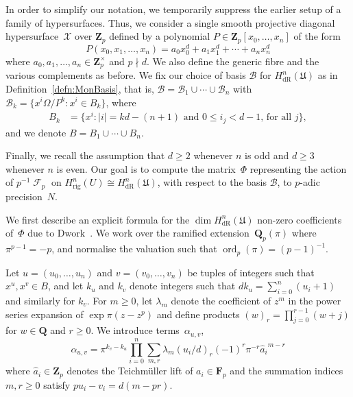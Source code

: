 \documentclass[a4paper,11pt]{article}
\numberwithin{equation}{section}
\providecommand{\abs}[1]{\lvert#1\rvert}                 %
\newcommand{\ZZ}{\mathbf{Z}} %
\newcommand{\QQ}{\mathbf{Q}} %
\DeclareMathOperator{\ord}{ord}          %
\DeclareMathOperator{\Frob}{\mathcal{F}} %
\providecommand{\HdR}{H_{\text{dR}}}    %
\providecommand{\Hrig}{H_{\text{rig}}}  %
\providecommand{\cB}{\mathcal{B}} %
\theoremstyle{definition}
\begin{document}
In order to simplify our notation, we temporarily suppress the earlier 
setup of a family of hypersurfaces. Thus, we consider a single smooth 
projective diagonal hypersurface~$\mathcal{X}$ over $\ZZ_p$ defined by 
a polynomial $P \in \ZZ_p[x_0, \dotsc, x_n]$ of the form
\begin{equation}
P(x_0, x_1, \dotsc, x_n) = 
    a_0 x_0^d + a_1 x_1^d + \dotsb + a_n x_n^d
\end{equation}
where $a_0, a_1, \dotsc, a_n \in \ZZ_p^{\times}$ and $p \nmid d$.  
We also define the generic fibre and the various complements as 
before.  We fix our choice of basis $\cB$ for $\HdR^{n}(\mathfrak{U})$ 
as in Definition~\ref{defn:MonBasis}, that is, $\cB = \cB_1 \cup \cdots \cup \cB_n$
with $\mathcal{B}_k  = \{x^i \Omega / P^k : x^i \in B_k \}$, where 
\begin{align}
B_k & = \{ x^i : \text{$\abs{i} = kd - (n+1)$ and $0 \leq i_j < d-1$, for all $j$} \},
\end{align}
and we denote $B = B_1 \cup \cdots \cup B_n$.

Finally, we recall the assumption that $d \geq 2$ whenever $n$ is 
odd and $d \geq 3$ whenever $n$ is even.  Our goal is to compute 
the matrix~$\Phi$ representing the action of $p^{-1} \Frob_p$ on 
$\Hrig^n(U) \cong \HdR^n(\mathfrak{U})$, with respect to the basis
$\cB$, to $p$-adic precision~$N$.

We first describe an explicit formula for the $\dim \HdR^n(\mathfrak{U})$ 
non-zero coefficients of~$\Phi$ due to Dwork~\citep{Dwork1964}. 
We work over the ramified extension~$\QQ_p(\pi)$ where $\pi^{p-1} = -p$, 
and normalise the valuation such that \mbox{$\ord_p(\pi) = (p-1)^{-1}$}.

Let $u = (u_0, \dotsc, u_n)$ and $v = (v_0, \dotsc, v_n)$ be tuples of integers such 
that $x^u, x^v \in B$,  and let $k_u$ and $k_v$ 
denote integers such that $d k_u = \sum_{i=0}^n (u_i + 1)$ and similarly 
for $k_v$.  For $m \geq 0$, let $\lambda_m$ denote the coefficient 
of $z^m$ in the power series expansion of $\exp \pi (z - z^p)$ and define 
products $(w)_r = \prod_{j=0}^{r-1} (w + j)$ for $w \in \QQ$ and $r \geq 0$. 
We introduce terms~$\alpha_{u,v}$, 
\begin{equation} \label{eq:alpha}
\alpha_{u,v} = \pi^{k_v - k_u} \prod_{i = 0}^n \sum_{m, r} \lambda_m (u_i / d)_r (-1)^r \pi^{-r} {\hat{a}_i}^{m-r}
\end{equation}
where $\hat{a}_i \in \ZZ_p$ denotes the Teichm\"uller lift of $a_i \in \mathbf{F}_p$ 
and the summation indices $m, r \geq 0$ satisfy $p u_i - v_i = d (m - pr)$.
\end{document}
